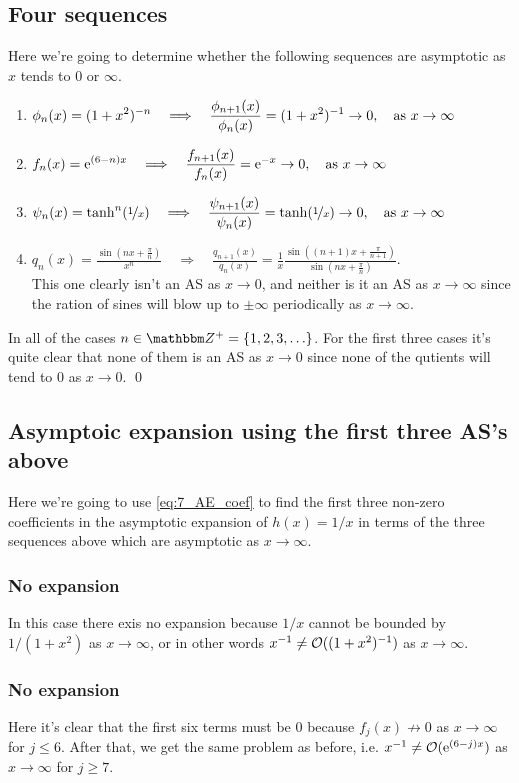 \documentclass[11pt,letter, swedish, english
]{article}
\begin{document}
\subsection{Four sequences}
Here we're going to determine whether the following sequences are
asymptotic as $x$ tends to $0$ or $\infty$.

\begin{enumerate}[label=(\roman*)]
\item $\displaystyle \phi_n(x)=(1+x^2)^{-n} \quad\Longrightarrow\quad
\frac{\phi_{n+1}(x)}{\phi_{n}(x)}=(1+x^2)^{-1}\to0\as x\to\infty$
\item $\displaystyle f_n(x)=\ee^{(6-n)x} \quad\Longrightarrow\quad
\frac{f_{n+1}(x)}{f_{n}(x)}=\ee^{-x}\to0\as x\to\infty$
\item $\displaystyle \psi_n(x)=\tanh^n(\nicefrac{1}{x}) \quad\Longrightarrow\quad
\frac{\psi_{n+1}(x)}{\psi_{n}(x)}=\tanh(\nicefrac{1}{x})\to0\as
x\to\infty$
\item $\displaystyle q_n(x)=\frac{\sin(nx+\frac{\pi}{n})}{x^n} \quad\Longrightarrow\quad
\frac{q_{n+1}(x)}{q_{n}(x)}=
\frac{1}{x}\frac{\sin((n+1)x+\frac{\pi}{n+1})}
{\sin(nx+\frac{\pi}{n})}.$ \\
This one clearly isn't an AS as $x\to0$, and neither is it an AS as
$x\to\infty$ since the ration of sines will blow up to $\pm\infty$
periodically as $x\to\infty$.
\end{enumerate}
In all of the cases $n\in\Z^+=\{1, 2, 3, \ldots\}$. For the first
three cases it's quite clear that none of them is an AS as $x\to0$
since none of the qutients will tend to 0 as $x\to0$.
\qed

\subsection{Asymptoic expansion using the first three AS's above}
Here we're going to use \eqref{eq:7_AE_coef} to find the first three
non-zero coefficients in the asymptotic expansion of $h(x)=1/x$ in
terms of the three sequences above which are asymptotic as
$x\to\infty$. 

\subsubsection{No expansion}
In this case there exis no expansion because $1/x$ cannot be bounded
by $1/(1+x^2)$ as $x\to\infty$, or in other words
$x^{-1}\neq\order*{(1+x^2)^{-1}}$ as $x\to\infty$.

\subsubsection{No expansion}
Here it's clear that the first six terms must be 0 because
$f_j(x)\not\to0$ as $x\to\infty$ for $j\le6$. After that, we get the
same problem as before, i.e. $x^{-1}\neq\order*{\ee^{(6-j)x}}$ as
$x\to\infty$ for $j\ge7$. 
\end{document}
